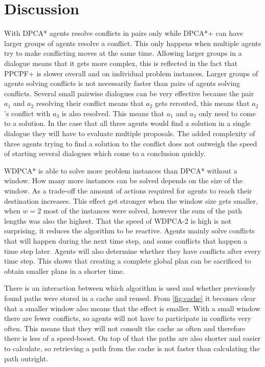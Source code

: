 \section{Discussion}\label{sec:discussion}
With DPCA* agents resolve conflicts in pairs only while DPCA*+ can have larger
groups of agents resolve a conflict. This only happens when multiple agents try
to make conflicting moves at the same time. Allowing larger groups in a
dialogue means that it gets more complex, this is reflected in the fact that
PPCPF+ is slower overall and on individual problem instances. Larger groups of
agents solving conflicts is not necessarily faster than pairs of agents solving
conflicts. Several small pairwise dialogues can be very effective because the
pair $a_1$ and $a_2$ resolving their conflict means that $a_2$ gets rerouted,
this means that $a_2$'s conflict with $a_3$ is also resolved. This means that
$a_1$ and $a_3$ only need to come to a solution. In the case that all three
agents would find a solution in a single dialogue they will have to evaluate
multiple proposals. The added complexity of three agents trying to find a
solution to the conflict does not outweigh the speed of starting several
dialogues which come to a conclusion quickly.

WDPCA* is able to solve more problem instances than DPCA* without a window. How
many more instances can be solved depends on the size of the window. As a
trade-off the amount of actions required for agents to reach their destination
increases. This effect get stronger when the window size gets smaller, when
$w=2$ most of the instances were solved, however the sum of the path lengths
was also the highest. That the speed of WDPCA-2 is high is not surprising, it
reduces the algorithm to be reactive. Agents mainly solve conflicts that will
happen during the next time step, and some conflicts that happen a time step
later. Agents will also determine whether they have conflicts after every time
step. This shows that creating a complete global plan can be sacrificed to
obtain smaller plans in a shorter time.

There is an interaction between which algorithm is used and whether previously
found paths were stored in a cache and reused. From \autoref{fig:cache} it
becomes clear that a smaller window also means that the effect is smaller. With
a small window there are fewer conflicts, so agents will not have to
participate in conflicts very often. This means that they will not consult the
cache as often and therefore there is less of a speed-boost. On top of that the
paths are also shorter and easier to calculate, so retrieving a path from the
cache is not faster than calculating the path outright.